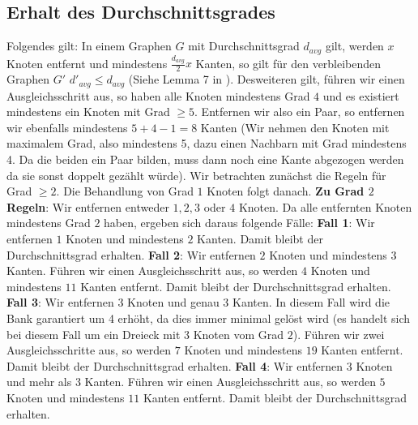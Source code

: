 \documentclass[12pt,onecolumn, notitlepage]{scrartcl}
\begin{document}
\subsection{Erhalt des Durchschnittsgrades}\label{subsec:ED}
Folgendes gilt: In einem Graphen $G$ mit Durchschnittsgrad $d_{avg}$ gilt, werden $x$ Knoten entfernt und mindestens $\frac{d_{avg}}{2} x$ Kanten, so gilt für den verbleibenden Graphen $G'$ ${d'}_{avg} \leq d_{avg}$ (Siehe Lemma 7 in \cite{BraFer}).\newline
Desweiteren gilt, führen wir einen Ausgleichsschritt aus, so haben alle Knoten mindestens Grad $4$ und es existiert mindestens ein Knoten mit Grad $\geq 5$. Entfernen wir also ein Paar, so entfernen wir ebenfalls mindestens $5 + 4 - 1 = 8$ Kanten (Wir nehmen den Knoten mit maximalem Grad, also mindestens 5, dazu einen Nachbarn mit Grad mindestens 4. Da die beiden ein Paar bilden, muss dann noch eine Kante abgezogen werden da sie sonst doppelt gezählt würde).\newline
Wir betrachten zunächst die Regeln für Grad $\geq 2$. Die Behandlung von Grad $1$ Knoten folgt danach.\newline \newline
\textbf{Zu Grad $2$ Regeln}:\newline
Wir entfernen entweder $1,2,3$ oder $4$ Knoten. Da alle entfernten Knoten mindestens Grad $2$ haben, ergeben sich daraus folgende Fälle:\newline \newline
\textbf{Fall 1}:  Wir entfernen $1$ Knoten und mindestens $2$ Kanten. Damit bleibt der Durchschnittsgrad erhalten.\newline
\textbf{Fall 2}: Wir entfernen $2$ Knoten und mindestens $3$ Kanten. Führen wir einen Ausgleichsschritt aus, so werden $4$ Knoten und mindestens $11$ Kanten entfernt. Damit bleibt der Durchschnittsgrad erhalten.\newline
\textbf{Fall 3}: Wir entfernen $3$ Knoten und genau $3$ Kanten. In diesem Fall wird die Bank garantiert um 4 erhöht, da dies immer minimal gelöst wird (es handelt sich bei diesem Fall um ein Dreieck mit $3$ Knoten vom Grad $2$). Führen wir zwei Ausgleichsschritte aus, so werden $7$ Knoten und mindestens $19$ Kanten entfernt. Damit bleibt der Durchschnittsgrad erhalten.\newline
\textbf{Fall 4}: Wir entfernen $3$ Knoten und mehr als $3$ Kanten. Führen wir einen Ausgleichsschritt aus, so werden $5$ Knoten und mindestens $11$ Kanten entfernt. Damit bleibt der Durchschnittsgrad erhalten.\newline
\end{document}
